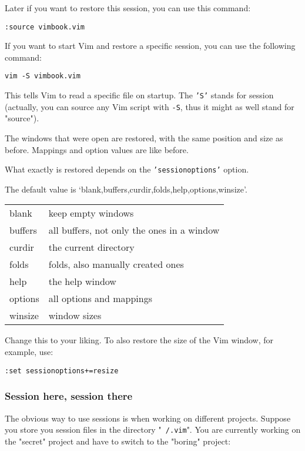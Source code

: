 Later if you want to restore this session, you can use this command:

\begin{Verbatim}[samepage=true]
 :source vimbook.vim
\end{Verbatim}

If you want to start Vim and restore a specific session, you can use the following command:

\begin{Verbatim}[samepage=true]
 vim -S vimbook.vim
\end{Verbatim}

This tells Vim to read a specific file on startup.
The \texttt{'S'} stands for session (actually, you can source any Vim script with \texttt{-S}, thus it might as well stand for "source").

The windows that were open are restored, with the same position and size as before.
Mappings and option values are like before.

What exactly is restored depends on the \texttt{'sessionoptions'} option.

The default value is `blank,buffers,curdir,folds,help,options,winsize'.

\begin{center} \begin{tabular}{l l}
				blank & keep empty windows \\
				buffers & all buffers, not only the ones in a window \\
				curdir & the current directory \\
				folds & folds, also manually created ones \\
				help & the help window \\
				options & all options and mappings \\
				winsize & window sizes \\
\end{tabular} \end{center}
Change this to your liking.
To also restore the size of the Vim window, for example, use:

\begin{Verbatim}[samepage=true]
 :set sessionoptions+=resize
\end{Verbatim}
\subsubsection{Session here, session there}
The obvious way to use sessions is when working on different projects.
Suppose you store you session files in the directory "\texttt{~/.vim}".
You are currently working on the "secret" project and have to switch to the "boring" project:

